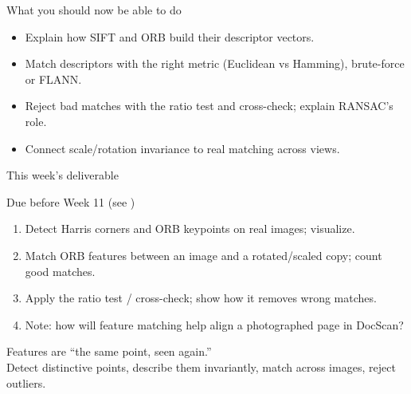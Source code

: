 \documentclass[10pt,aspectratio=169]{beamer}
\begin{document}
\begin{frame}{What you should now be able to do}
  \begin{itemize}
    \item Explain how SIFT and ORB build their descriptor vectors.
    \item Match descriptors with the right metric (Euclidean vs Hamming), brute-force or FLANN.
    \item Reject bad matches with the ratio test and cross-check; explain RANSAC's role.
    \item Connect scale/rotation invariance to real matching across views.
  \end{itemize}
\end{frame}

\begin{frame}{This week's deliverable}
  \begin{alertblock}{Due before Week 11 (see )}
    \begin{enumerate}
      \item Detect Harris corners and ORB keypoints on real images; visualize.
      \item Match ORB features between an image and a rotated/scaled copy; count good matches.
      \item Apply the ratio test / cross-check; show how it removes wrong matches.
      \item Note: how will feature matching help align a photographed page in DocScan?
    \end{enumerate}
  \end{alertblock}
\end{frame}

\begin{frame}[standout]
  Features are ``the same point, seen again.''\\[4pt]
  \normalsize Detect distinctive points, describe them invariantly, match across images, reject outliers.
\end{frame}
\end{document}
